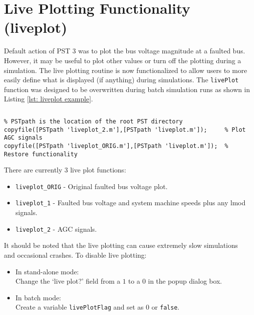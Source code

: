 \section{Live Plotting Functionality (liveplot)} 
Default action of PST 3 was to plot the bus voltage magnitude at a faulted bus.
However, it may be useful to plot other values or turn off the plotting during a simulation.
The live plotting routine is now functionalized to allow users to more easily define what is displayed (if anything) during simulations.
The \verb|livePlot| function was designed to be overwritten during batch simulation runs as shown in Listing \ref{lst: liveplot example}.

\begin{lstlisting}[caption={Live Plotting Overwrite Example},label={lst: liveplot example}]
\end{lstlisting}\vspace{-2 em}
\begin{verbatim}
% PSTpath is the location of the root PST directory
copyfile([PSTpath 'liveplot_2.m'],[PSTpath 'liveplot.m']);     % Plot AGC signals 
copyfile([PSTpath 'liveplot_ORIG.m'],[PSTpath 'liveplot.m']);  % Restore functionality
\end{verbatim}

There are currently 3 live plot functions:

\begin{itemize}
 em
\item \verb|liveplot_ORIG| - Original faulted bus voltage plot.
\item \verb|liveplot_1| - Faulted bus voltage and system machine speeds plus any lmod signals.
\item \verb|liveplot_2| - AGC signals.
\end{itemize}

It should be noted that the live plotting can cause extremely slow simulations and occasional crashes.
To disable live plotting:
\begin{itemize}
 em
\item In stand-alone mode: \\Change the `live plot?' field from a $1$ to a $0$ in the popup dialog box.
\item In batch mode:  \\Create a variable \verb|livePlotFlag| and set as $0$ or \verb|false|.
\end{itemize}